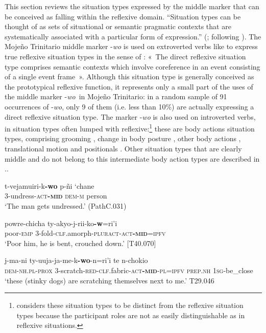 \documentclass[output=paper]{langscibook}
\begin{document}
This section reviews the situation types expressed by the middle marker that can be conceived as falling within the reflexive domain. “Situation types can be thought of as sets of situational or semantic pragmatic contexts that are systematically associated with a particular form of expression.” (\citealt[7]{Kemmer1993}; following \citealt{Talmy1972}). The Mojeño Trinitario middle marker -\textit{wo} is used on extroverted verbs like  to express true reflexive situation types in the sense of \citet[45]{Kemmer1993}: «~The direct reflexive situation type comprises semantic contexts which involve coreference in an event consisting of a single event frame~». Although this situation type is generally conceived as the prototypical reflexive function, it represents only a small part of the uses of the middle marker -\textit{wo}~in Mojeño Trinitario: in a random sample of 91 occurrences of -\textit{wo}, only 9 of them (i.e. less than 10\%) are actually expressing a direct reflexive situation type. The marker -\textit{wo} is also used on introverted verbs, in situation types often lumped with reflexive:\footnote{\citet[53-70]{Kemmer1993} considers these situation types to be distinct from the reflexive situation types because the participant roles are not as easily distinguishable as in reflexive situations.} these are body actions situation types, comprising grooming , change in body posture , other body actions , translational motion  and positionals . Other situation types that are clearly middle and do not belong to this intermediate body action types are described in ..


\ea
\label{ex:Rose:12}
\gll t-vejamuiri-k\textbf{-wo} p-ñi `chane \\
3-undress-\textsc{act\textbf{-mid}} \textsc{dem-m} person\\
\glt ‘The man gets undressed.’ (PathC.031)
\z

\ea
\label{ex:Rose:13}
\gll powre-chicha ty-akyo-j-rii-ko\textbf{-w}=ri'i\\
poor-\textsc{emp} 3-fold-\textsc{clf}.amorph-\textsc{pluract-act\textbf{-mid}=ipfv}\\
\glt ‘Poor him, he is bent, crouched down.’ [T40.070]
\z

\ea
\label{ex:Rose:14}
\gll j-ma-ni ty-uuja-ja-me-k\textbf{-wo}-n=ri'i te n-chokio \\
\textsc{dem-nh.pl-prox} 3-scratch-\textsc{red-clf}.fabric-\textsc{act\textbf{-mid}-pl=ipfv} \textsc{prep.nh} \textsc{1sg}-be\_close\\
\glt ‘these (stinky dogs) are scratching themselves next to me.’ T29.046
\z
\end{document}
